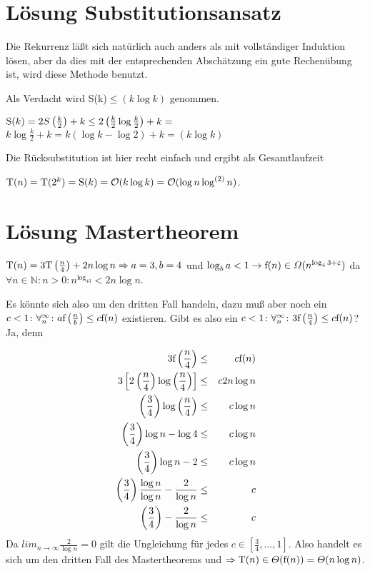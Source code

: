 \documentclass[ngerman,draft,parskip=half*,twoside]{scrreprt}
\theoremstyle{break}
\theoremstyle{nonumberbreak}
\newcommand*{\OO}{\mathcal{O}}      %
\newcommand*{\N}{\mathbb{N}}        %
\begin{document}
\section{Lösung Substitutionsansatz}
\label{lsg_substitutionsansatz}

Die Rekurrenz läßt sich natürlich auch anders als mit vollständiger Induktion lösen, aber da dies mit der entsprechenden Abschätzung ein
gute Rechenübung ist, wird diese Methode benutzt.

Als Verdacht wird S(k)$\leq(k \log k)$ genommen.


$\textup{S}(k) = 2 S\left(\frac{k}{2}\right)+k\leq 2 \left(\frac{k}{2} \log \frac{k}{2}\right)+k=$
$k \log \frac{k}{2}+k=k \left(\log k-\log 2\right)+k=(k \log k)$

Die Rücksubstitution ist hier recht einfach und ergibt als Gesamtlaufzeit

$\textup{T}(n)=\textup{T}(2^k)=\textup{S}(k)=\OO(k \log k)=\OO(\log n \log^{(2)} n)$.

\section{Lösung Mastertheorem}
\label{mastertheorem_Fall3}

$ \textup{T}(n) = 3 \textup{T}\left(\frac{n}{4}\right) + 2n\log n \Rightarrow a=3,b=4$ und $\log_ba<1 \rightarrow 
\textup{f}(n) \in \Omega(n^{\log_43+\varepsilon})$ da $\forall n \in \N\colon  n>0\colon  n^{\log_43}<2n\log n$.

Es könnte sich also um den dritten Fall handeln, dazu muß aber noch ein $c < 1 \colon  \forall^{\infty}_{n}\colon 
a \textup{f}\left(\frac{n}{b}\right)  \leq c \textup{f}(n)$ existieren. Gibt es also ein 
$c<1\colon  \forall^{\infty}_{n}\colon  3\textup{f}\left(\frac{n}{4}\right) \leq c\textup{f}(n)$? Ja, denn

\begin{align*}
3\textup{f}\left(\frac{n}{4}\right) & \leq & c \textup{f}(n)\\
3\left[2\left(\frac{n}{4}\right) \log \left(\frac{n}{4}\right)\right] & \leq & c 2n \log n\\
\left(\frac{3}{4}\right) \log \left(\frac{n}{4}\right) & \leq & c \log n\\
\left(\frac{3}{4}\right) \log n- \log 4 & \leq & c \log n\\
\left(\frac{3}{4}\right) \log n- 2 & \leq & c \log n\\
\left(\frac{3}{4}\right) \frac{\log n}{\log n}-\frac{2}{\log n} & \leq & c\\
\left(\frac{3}{4}\right) -\frac{2}{\log n} & \leq & c
\end{align*}
Da $lim_{n \to \infty} \frac{2}{\log n}=0$ gilt die Ungleichung für jedes $c \in [\frac{3}{4},\ldots,1]$. %
Also handelt es sich um den dritten Fall des Mastertheorems und 
$ \Rightarrow \textup{T}(n) \in \Theta (\textup{f}(n))=\Theta (n\log n)$.
\end{document}
